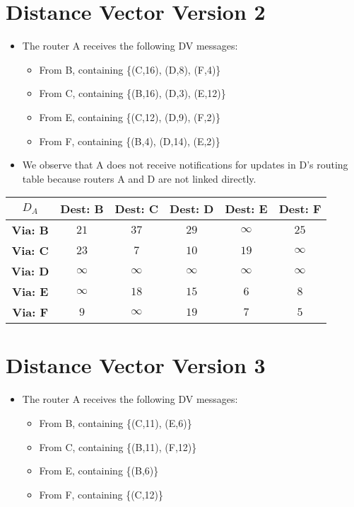 \documentclass[]{article}
\begin{document}
	\section*{Distance Vector Version 2}
	
	\begin{itemize}
		\item The router A receives the following DV messages:
		\begin{itemize}
			\item From B, containing \{(C,16), (D,8), (F,4)\}
			\item From C, containing \{(B,16), (D,3), (E,12)\}
			\item From E, containing \{(C,12), (D,9), (F,2)\}
			\item From F, containing \{(B,4), (D,14), (E,2)\}
		\end{itemize}
		\item We observe that A does not receive notifications for updates in D's routing table because routers A and D are not linked directly.
	\end{itemize}
	
	\begin{center}
		\begin{tabular}{ |c|c|c|c|c|c| } 
			\hline
			\textbf{$D_A$} & \textbf{Dest: B} & \textbf{Dest: C} &  \textbf{Dest: D} & \textbf{Dest: E} & \textbf{Dest: F} \\
			\hline
			\textbf{Via: B} & $21$ & $37$ & $29$ & $\infty$ & $25$ \\
			\hline 
			\textbf{Via: C} & $23$ & $7$ & $10$ & $19$ & $\infty$ \\
			\hline
			\textbf{Via: D} & $\infty$ & $\infty$ & $\infty$ & $\infty$ & $\infty$ \\
			\hline
			\textbf{Via: E} & $\infty$ & $18$ & $15$ & $6$ & $8$ \\
			\hline
			\textbf{Via: F} & $9$ & $\infty$ & $19$ & $7$ & $5$ \\
			\hline
		\end{tabular}
	\end{center}
	
	\section*{Distance Vector Version 3}
	
	\begin{itemize}
		\item The router A receives the following DV messages:
		\begin{itemize}
			\item From B, containing \{(C,11), (E,6)\}
			\item From C, containing \{(B,11), (F,12)\}
			\item From E, containing \{(B,6)\}
			\item From F, containing \{(C,12)\}
		\end{itemize}
	\end{itemize}
	
\end{document}
